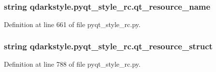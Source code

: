\subsubsection[{qt\+\_\+resource\+\_\+name}]{\setlength{\rightskip}{0pt plus 5cm}string qdarkstyle.\+pyqt\+\_\+style\+\_\+rc.\+qt\+\_\+resource\+\_\+name}\label{namespaceqdarkstyle_1_1pyqt__style__rc_ad8954ce6e8fb88247bd158568e1a7c02}


Definition at line 661 of file pyqt\+\_\+style\+\_\+rc.\+py.

\hypertarget{namespaceqdarkstyle_1_1pyqt__style__rc_abd252a203c4336b96bcb1c4e9358df40}{}
\subsubsection[{qt\+\_\+resource\+\_\+struct}]{\setlength{\rightskip}{0pt plus 5cm}string qdarkstyle.\+pyqt\+\_\+style\+\_\+rc.\+qt\+\_\+resource\+\_\+struct}\label{namespaceqdarkstyle_1_1pyqt__style__rc_abd252a203c4336b96bcb1c4e9358df40}


Definition at line 788 of file pyqt\+\_\+style\+\_\+rc.\+py.

